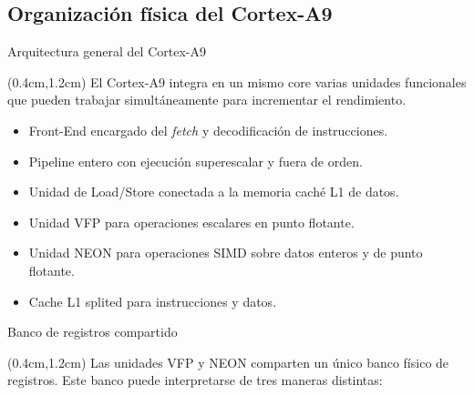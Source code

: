 \subsection{Organización física del Cortex-A9}
\begin{frame}{Arquitectura general del Cortex-A9}
 \begin{textblock*}{\textwidth}(0.4cm,1.2cm)
 \justifying El Cortex-A9 integra en un mismo core varias unidades funcionales que pueden trabajar simultáneamente para incrementar el rendimiento.
  \vspace{0.3cm}
  \begin{itemize}[<+(1)->]
   \item Front-End encargado del \textit{fetch} y decodificación de instrucciones.
   \item Pipeline entero con ejecución superescalar y fuera de orden.
   \item Unidad de Load/Store conectada a la memoria caché L1 de datos.
   \item Unidad VFP para operaciones escalares en punto flotante.
   \item Unidad NEON para operaciones SIMD sobre datos enteros y de punto flotante.
   \item Cache L1 splited para instrucciones y datos.
  \end{itemize}
  \vspace{0.4cm}
 \end{textblock*}
\end{frame}

\begin{frame}{Banco de registros compartido}
 \begin{textblock*}{\textwidth}(0.4cm,1.2cm)
 \justifying Las unidades VFP y NEON comparten un único banco físico de registros. Este banco puede interpretarse de tres maneras distintas:

 \vspace{0.2cm}
 \vspace{0.2cm}
 \vspace{0.2cm}
 \vspace{0.4cm}
 \end{textblock*}
\end{frame}

